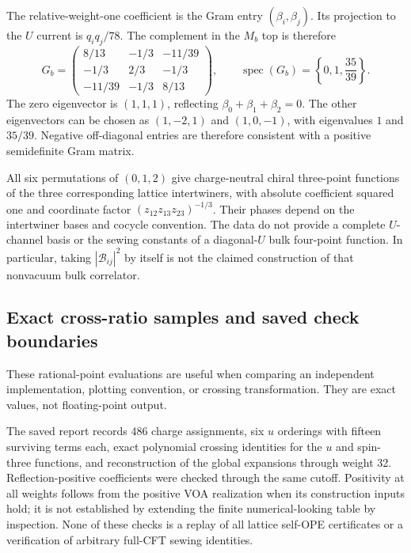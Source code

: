 

The relative-weight-one coefficient is the Gram entry
$(\beta_i,\beta_j)$. Its projection to the $U$ current is
$q_iq_j/78$. The complement in the $M_b$ top is therefore
\[
 G_b=\begin{pmatrix}
 8/13&-1/3&-11/39\\
 -1/3&2/3&-1/3\\
 -11/39&-1/3&8/13
 \end{pmatrix},\qquad
 \operatorname{spec}(G_b)=\left\{0,1,\frac{35}{39}\right\}.
\]
The zero eigenvector is $(1,1,1)$, reflecting
$\beta_0+\beta_1+\beta_2=0$. The other eigenvectors can be
chosen as $(1,-2,1)$ and $(1,0,-1)$, with eigenvalues $1$ and
$35/39$. Negative off-diagonal entries are therefore consistent
with a positive semidefinite Gram matrix.

All six permutations of $(0,1,2)$ give charge-neutral chiral
three-point functions of the three corresponding lattice
intertwiners, with absolute coefficient squared one and coordinate
factor $(z_{12}z_{13}z_{23})^{-1/3}$. Their phases depend on the
intertwiner bases and cocycle convention. The data do not provide
a complete $U$-channel basis or the sewing constants of a
diagonal-$U$ bulk four-point function. In particular, taking
$|\mathcal B_{ij}|^2$ by itself is not the claimed construction
of that nonvacuum bulk correlator.

\subsection{Exact cross-ratio samples and saved check boundaries}

These rational-point evaluations are useful when comparing an
independent implementation, plotting convention, or crossing
transformation. They are exact values, not floating-point output.



The saved report records 486 charge assignments, six $u$ orderings
with fifteen surviving terms each, exact polynomial crossing
identities for the $u$ and spin-three functions, and reconstruction
of the global expansions through weight 32. Reflection-positive
coefficients were checked through the same cutoff. Positivity at
all weights follows from the positive VOA realization when its
construction inputs hold; it is not established by extending the
finite numerical-looking table by inspection. None of these checks
is a replay of all lattice self-OPE certificates or a verification
of arbitrary full-CFT sewing identities.

